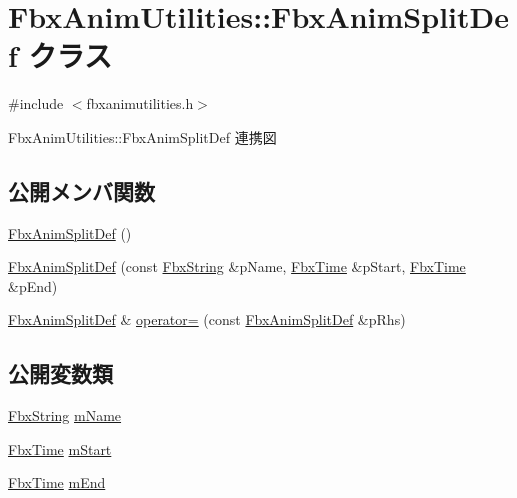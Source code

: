 \hypertarget{class_fbx_anim_utilities_1_1_fbx_anim_split_def}{}\section{Fbx\+Anim\+Utilities\+:\+:Fbx\+Anim\+Split\+Def クラス}
\label{class_fbx_anim_utilities_1_1_fbx_anim_split_def}


{\ttfamily \#include $<$fbxanimutilities.\+h$>$}



Fbx\+Anim\+Utilities\+:\+:Fbx\+Anim\+Split\+Def 連携図
\subsection*{公開メンバ関数}
\begin{DoxyCompactItemize}
\item 
\hyperlink{class_fbx_anim_utilities_1_1_fbx_anim_split_def_ad921439ab544295b62f250b3b1a8e3da}{Fbx\+Anim\+Split\+Def} ()
\item 
\hyperlink{class_fbx_anim_utilities_1_1_fbx_anim_split_def_a90737793295d433c713584ffd27fa5c1}{Fbx\+Anim\+Split\+Def} (const \hyperlink{class_fbx_string}{Fbx\+String} \&p\+Name, \hyperlink{class_fbx_time}{Fbx\+Time} \&p\+Start, \hyperlink{class_fbx_time}{Fbx\+Time} \&p\+End)
\item 
\hyperlink{class_fbx_anim_utilities_1_1_fbx_anim_split_def}{Fbx\+Anim\+Split\+Def} \& \hyperlink{class_fbx_anim_utilities_1_1_fbx_anim_split_def_a94315e091906bc664030ee1000785e90}{operator=} (const \hyperlink{class_fbx_anim_utilities_1_1_fbx_anim_split_def}{Fbx\+Anim\+Split\+Def} \&p\+Rhs)
\end{DoxyCompactItemize}
\subsection*{公開変数類}
\begin{DoxyCompactItemize}
\item 
\hyperlink{class_fbx_string}{Fbx\+String} \hyperlink{class_fbx_anim_utilities_1_1_fbx_anim_split_def_ae78929097a3526acf01e3d0f7f89796f}{m\+Name}
\item 
\hyperlink{class_fbx_time}{Fbx\+Time} \hyperlink{class_fbx_anim_utilities_1_1_fbx_anim_split_def_af8aad5671b9f1bef7a5af4a226a0f646}{m\+Start}
\item 
\hyperlink{class_fbx_time}{Fbx\+Time} \hyperlink{class_fbx_anim_utilities_1_1_fbx_anim_split_def_a16aca4564d9609c2409c3be7fb0a5bd3}{m\+End}
\end{DoxyCompactItemize}


